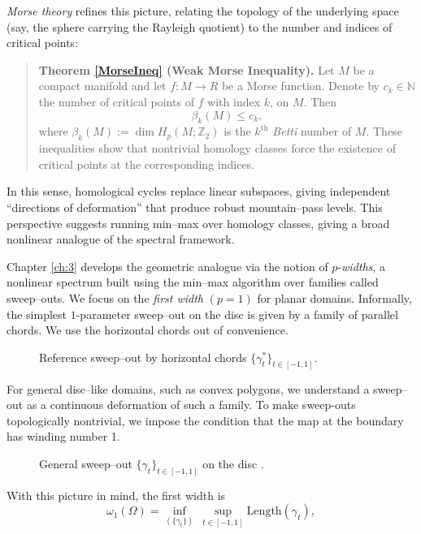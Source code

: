\noindent \emph{Morse theory} refines this picture, relating the topology of the underlying space (say, the sphere carrying the Rayleigh quotient) to the number and indices of critical points: 
\begin{quote}
\textbf{Theorem \ref{MorseIneq} (Weak Morse Inequality).}
Let $M$ be a compact manifold and let $f:M\rightarrow R$ be a Morse function. Denote by $c_k \in \mathbb{N}$ the number of critical points of $f$ with index $k$, on $M$. Then
$$\beta_k(M) \leq c_k,$$
where $\beta_k(M) := \dim H_p(M;\mathbb{Z}_2)$ is the $k^{\text{th}}$ \emph{Betti} number of $M$. These inequalities show that nontrivial homology classes force the existence of critical points at the corresponding indices.
\end{quote}
In this sense, homological cycles replace linear subspaces, giving independent “directions of deformation” that produce robust mountain--pass levels. This perspective suggests running min--max over homology classes, giving a broad nonlinear analogue of the spectral framework.

\noindent Chapter \ref{ch:3} develops the geometric analogue via the notion of $p$-\emph{widths}, a nonlinear spectrum built using the min--max algorithm over families called sweep--outs. We focus on the \emph{first width} $(p=1)$ for planar domains. Informally, the simplest $1$-parameter sweep--out on the disc is given by a family of parallel chords. We use the horizontal chords out of convenience. 
\begin{figure}[ht]
  \centering
  
  \caption{Reference sweep--out by horizontal chords $\{\gamma_t^*\}_{t\in[-1,1]}$.}
\end{figure}
\FloatBarrier

\noindent For general disc--like domains, such as convex polygons, we understand a sweep--out as a continuous deformation of such a family. To make sweep-outs topologically nontrivial, we impose the condition that the map at the boundary has winding number 1. 
\begin{figure}[ht]
  \centering
  
  \caption{General sweep--out $\{\gamma_t\}_{t\in[-1,1]}$ on the disc .}
\end{figure}
\FloatBarrier

\noindent With this picture in mind, the first width is
\begin{equation}
    \omega_1(\Omega)=\inf_{(\{\gamma_t\})}\ \sup_{t\in[-1,1]}\mathrm{Length}(\gamma_t),   
\end{equation}

